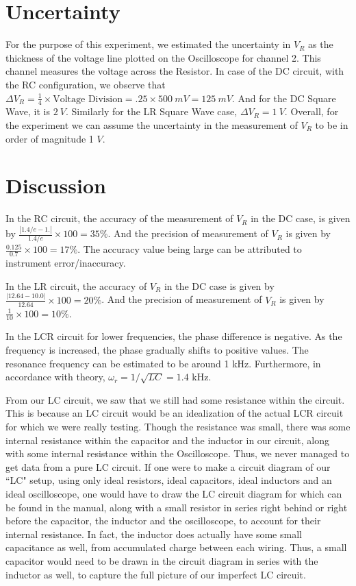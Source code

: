 \documentclass[a4paper,12pt]{article}
\begin{document}
\section{Uncertainty}

For the purpose of this experiment, we estimated the uncertainty in $V_R$
as the thickness of the voltage line plotted on the Oscilloscope for channel 2. This channel 
measures the voltage across the Resistor. In case of the DC circuit, with the RC configuration, we observe that 
$\Delta V_R = \frac{1}{4} \times \text{Voltage Division} = .25 \times 500\ mV = 125\ mV$. 
And for the DC Square Wave, it is $2\ V$. Similarly for the LR Square Wave case, $\Delta V_R = 1\ V$.
Overall, for the experiment we can assume the uncertainty in the measurement of $V_R$ to be 
in order of magnitude 1 $V$.

\section{Discussion}

In the RC circuit, the accuracy of the measurement of $V_R$ in the DC case, is given by $\frac{|1.4/e - 1.|}{1.4/e} \times 100 = 35 \%$. 
And the precision of measurement of $V_R$ is given by $\frac{0.125}{0.7} \times 100 = 17 \%$. 
The accuracy value being large can be attributed to instrument error/inaccuracy.

In the LR circuit, the accuracy of $V_R$ in the DC case is given by $\frac{|12.64 - 10.0|}{12.64} \times 100 = 20 \%$. 
And the precision of measurement of $V_R$ is given by $\frac{1}{10} \times 100 = 10 \%$. 

In the LCR circuit for lower frequencies, the phase difference is negative. As the frequency is
increased, the phase gradually shifts to positive values. The resonance frequency can be estimated to be around 1 kHz. 
Furthermore, in accordance with theory, $\omega_r = 1/\sqrt{LC} = 1.4$ kHz.

From our LC circuit, we saw that we still had some resistance within the circuit. This is because an LC circuit would 
be an idealization of the actual LCR circuit for which we were really testing. Though the resistance was small, there was
some internal resistance within the capacitor and the inductor in our circuit, along with some internal resistance within the Oscilloscope.
Thus, we never managed to get data from a pure LC circuit. If one were to make a circuit diagram of our ``LC" setup, using only ideal resistors, 
ideal capacitors, ideal inductors and an ideal oscilloscope, one would have to draw the LC circuit diagram for which can be found in the manual,
along with a small resistor in series right behind or right before the capacitor, the inductor and the oscilloscope, to account for their internal resistance.
In fact, the inductor does actually have some small capacitance as well, from accumulated charge between each wiring. Thus, a small capacitor 
would need to be drawn in the circuit diagram in series with the inductor as well, to capture the full picture of our imperfect LC circuit.
\end{document}
